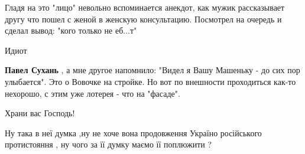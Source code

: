 \begin{itemize}
 
Гладя на это "лицо" невольно вспоминается анекдот, как мужик рассказывает другу
что пошел с женой в женскую консультацию. Посмотрел на очередь и сделал вывод:
"кого только не еб...т"

\begin{itemize}
 
Идиот

 
\textbf{Павел Сухань} , а мне другое напомнило: "Видел я Вашу Машеньку - до сих
пор улыбается". Это о Вовочке на стройке. Но вот по внешности проходиться
как-то нехорошо, с этим уже лотерея - что на "фасаде".
\end{itemize}

 
Храни вас Господь!

 
Ну така в неї думка ,ну не хоче вона продовження Україно російського протистояння , ну чого за її думку маємо її поплюжити ?

 

\end{itemize}
